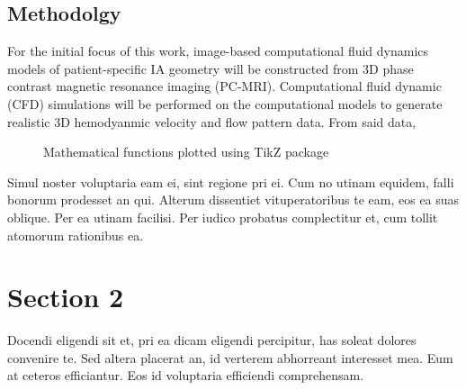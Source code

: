 \subsection{Methodolgy}\label{CHAPTER1_SECTION1_SUBSECTION2}
For the initial focus of this work, image-based computational fluid dynamics models of patient-specific IA geometry will be constructed from 3D phase contrast magnetic resonance imaging (PC-MRI). Computational fluid dynamic (CFD) simulations will be performed on the computational models to generate realistic 3D hemodyanmic velocity and flow pattern data. From said data, 


\begin{figure}[htb]
  \begin{center}
  \end{center}
  \caption{Mathematical functions plotted using TikZ package}
  \label{CHAPTER1_FIG02}
\end{figure}

Simul noster voluptaria eam ei, sint regione pri ei. Cum no utinam equidem, 
falli bonorum prodesset an qui. Alterum dissentiet vituperatoribus te eam, 
eos ea suas oblique. Per ea utinam facilisi. \cite{DMOL3_02,HPL_01,HPL_02}
Per iudico probatus complectitur et, cum tollit atomorum rationibus ea.

\section{Section 2}\label{CHAPTER1_SECTION2}

Docendi eligendi sit et, pri ea dicam eligendi percipitur, has soleat 
dolores convenire te. Sed altera placerat an, id verterem abhorreant 
interesset mea. Eum at ceteros efficiantur. Eos id voluptaria efficiendi 
comprehensam. \cite{HPL_DGEMM_01,HPL_DGEMM_02}

